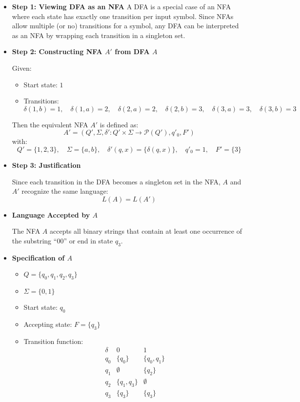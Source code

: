 \documentclass[11pt]{article}
\begin{document}
\begin{itemize}[leftmargin=*]

\item \textbf{Step 1: Viewing DFA as an NFA}  
A DFA is a special case of an NFA where each state has exactly one transition per input symbol. Since NFAs allow multiple (or no) transitions for a symbol, any DFA can be interpreted as an NFA by wrapping each transition in a singleton set.

\item \textbf{Step 2: Constructing NFA $A'$ from DFA $A$}

Given:
\begin{itemize}
    \item Start state: $1$
    \item Transitions:
    \[
    \delta(1, b) = 1,\quad \delta(1, a) = 2,\quad \delta(2, a) = 2,\quad \delta(2, b) = 3,\quad \delta(3, a) = 3,\quad \delta(3, b) = 3
    \]
\end{itemize}

Then the equivalent NFA $A'$ is defined as:
\[
A' = (Q', \Sigma, \delta': Q' \times \Sigma \rightarrow \mathcal{P}(Q'), q'_0, F')
\]
with:
\[
Q' = \{1, 2, 3\},\quad \Sigma = \{a, b\},\quad \delta'(q, x) = \{\delta(q, x)\},\quad q'_0 = 1,\quad F' = \{3\}
\]

\item \textbf{Step 3: Justification}

Since each transition in the DFA becomes a singleton set in the NFA, $A$ and $A'$ recognize the same language:  
\[
L(A) = L(A')
\]

\item \textbf{Language Accepted by $A$}

The NFA $A$ accepts all binary strings that contain at least one occurrence of the substring ``00'' or end in state $q_3$.

\item \textbf{Specification of $A$}

\begin{itemize}
    \item $Q = \{q_0, q_1, q_2, q_3\}$
    \item $\Sigma = \{0, 1\}$
    \item Start state: $q_0$
    \item Accepting state: $F = \{q_3\}$
    \item Transition function:
    \[
    \begin{array}{c|cc}
    \delta & 0 & 1 \\
    \hline
    q_0 & \{q_0\} & \{q_0, q_1\} \\
    q_1 & \emptyset & \{q_2\} \\
    q_2 & \{q_1, q_3\} & \emptyset \\
    q_3 & \{q_3\} & \{q_3\} \\
    \end{array}
    \]
\end{itemize}


\end{itemize}
\end{document}
